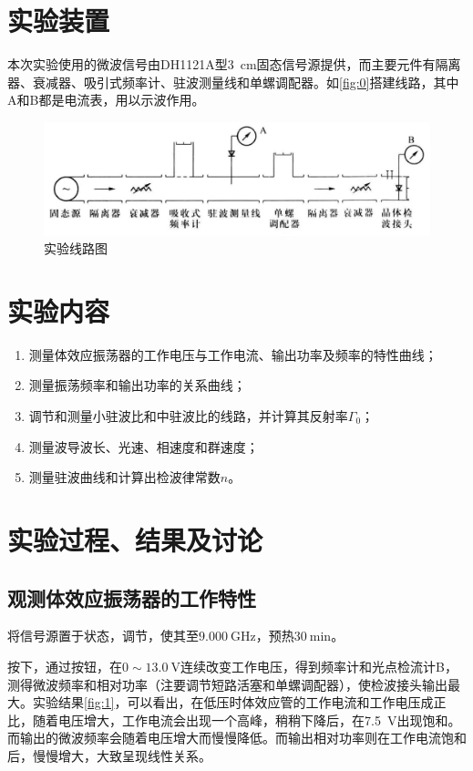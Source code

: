 \documentclass[font=fandol]{mpltx}
\begin{document}
\section{实验装置}
本次实验使用的微波信号由DH1121A型\qty{3}{\cm}固态信号源提供，而主要元件有隔离器、衰减器、吸引式频率计、驻波测量线和单螺调配器。如\autoref{fig:0}搭建线路，其中A和B都是电流表，用以示波作用。
\begin{figure}
	\centering
	\includegraphics[width=0.85\linewidth]{fig/0.jpg}
	\caption{实验线路图\cite{jindaishiyan}}
	\label{fig:0}
\end{figure}

\section{实验内容}
\begin{enumerate}
	\item 测量体效应振荡器的工作电压与工作电流、输出功率及频率的特性曲线；
	\item 测量振荡频率和输出功率的关系曲线；
	\item 调节和测量小驻波比和中驻波比的线路，并计算其反射率$\Gamma_0$；
	\item 测量波导波长、光速、相速度和群速度；
	\item 测量驻波曲线和计算出检波律常数$n$。
\end{enumerate}

\section{实验过程、结果及讨论}
\subsection{观测体效应振荡器的工作特性}
将信号源置于状态，调节，使其至$\qty{9.000}{\GHz}$，预热$\qty{30}{\minute}$。
\par
按下，通过按钮，在$0\sim\qty{13.0}{\V}$连续改变工作电压，得到频率计和光点检流计B，测得微波频率和相对功率（注要调节短路活塞和单螺调配器），使检波接头输出最大。实验结果\autoref{fig:1}，可以看出，在低压时体效应管的工作电流和工作电压成正比，随着电压增大，工作电流会出现一个高峰，稍稍下降后，在\qty{7.5}{\V}出现饱和。而输出的微波频率会随着电压增大而慢慢降低。而输出相对功率则在工作电流饱和后，慢慢增大，大致呈现线性关系。
\end{document}
